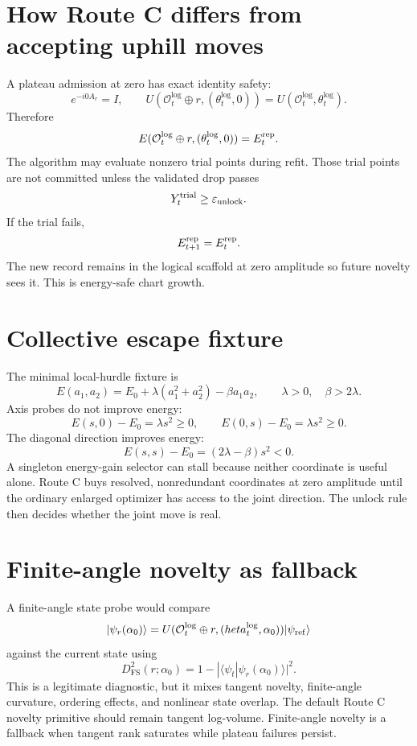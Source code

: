 \documentclass[10pt,twocolumn]{article}
\newcommand{\eps}{\varepsilon}
\newcommand{\logi}{\mathrm{log}}
\newcommand{\FS}{\mathrm{FS}}
\begin{document}
\section{How Route C differs from accepting uphill moves}

A plateau admission at zero has exact identity safety:
\[
e^{-i0A_r}=I,
\qquad
U(\mathcal O_t^{\logi}\oplus r, (\theta_t^{\logi},0))
=U(\mathcal O_t^{\logi},\theta_t^{\logi}).
\]
Therefore
\[
E(\mathcal O_t^{\logi}\oplus r, (\theta_t^{\logi},0))
=E_t^{\rm rep}.
\]
The algorithm may evaluate nonzero trial points during refit. Those trial points
are not committed unless the validated drop passes
\[
Y_t^{\rm trial}\ge\eps_{\rm unlock}.
\]
If the trial fails,
\[
E_{t+1}^{\rm rep}=E_t^{\rm rep}.
\]
The new record remains in the logical scaffold at zero amplitude so future
novelty sees it. This is energy-safe chart growth.

\section{Collective escape fixture}

The minimal local-hurdle fixture is
\[
E(a_1,a_2)=E_0+\lambda(a_1^2+a_2^2)-\beta a_1a_2,
\qquad
\lambda>0,
\quad
\beta>2\lambda.
\]
Axis probes do not improve energy:
\[
E(s,0)-E_0=\lambda s^2\ge0,
\qquad
E(0,s)-E_0=\lambda s^2\ge0.
\]
The diagonal direction improves energy:
\[
E(s,s)-E_0=(2\lambda-\beta)s^2<0.
\]
A singleton energy-gain selector can stall because neither coordinate is useful
alone. Route C buys resolved, nonredundant coordinates at zero amplitude until
the ordinary enlarged optimizer has access to the joint direction. The unlock
rule then decides whether the joint move is real.

\section{Finite-angle novelty as fallback}

A finite-angle state probe would compare
\[
|\psi_r(\alpha_0)\rangle
=U(\mathcal O_t^{\logi}\oplus r,(	heta_t^{\logi},\alpha_0))
|\psi_{\rm ref}\rangle
\]
against the current state using
\[
D_{\FS}^2(r;\alpha_0)=1-|\langle\psi_t|\psi_r(\alpha_0)\rangle|^2.
\]
This is a legitimate diagnostic, but it mixes tangent novelty, finite-angle
curvature, ordering effects, and nonlinear state overlap. The default Route C
novelty primitive should remain tangent log-volume. Finite-angle novelty is a
fallback when tangent rank saturates while plateau failures persist.
\end{document}

